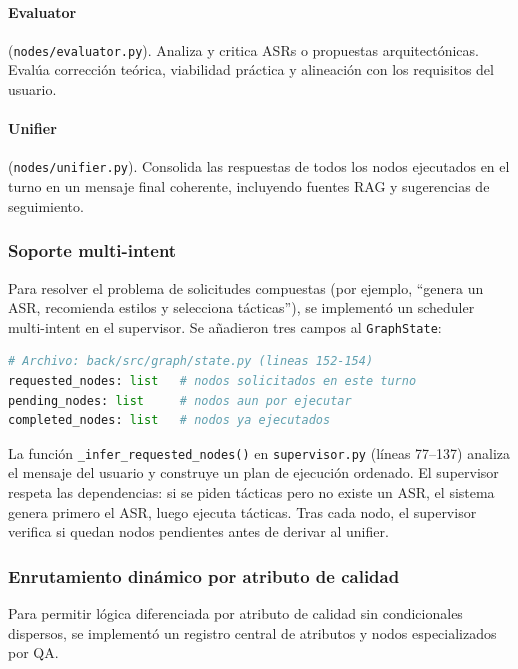 \documentclass[12pt, letterpaper, oneside]{article}
\begin{document}
\paragraph{Evaluator} (\texttt{nodes/evaluator.py}).
Analiza y critica ASRs o propuestas arquitectónicas. Evalúa corrección teórica,
viabilidad práctica y alineación con los requisitos del usuario.

\paragraph{Unifier} (\texttt{nodes/unifier.py}).
Consolida las respuestas de todos los nodos ejecutados en el turno en un mensaje
final coherente, incluyendo fuentes RAG y sugerencias de seguimiento.

\subsubsection{Soporte multi-intent}
\label{sssec:multi-intent}

Para resolver el problema de solicitudes compuestas (por ejemplo, ``genera un ASR,
recomienda estilos y selecciona tácticas''), se implementó un scheduler
multi-intent en el supervisor. Se añadieron tres campos al \texttt{GraphState}:

\begin{lstlisting}[language=Python,
  caption={Campos de planificación multi-intent en \texttt{GraphState}},
  label={lst:multi-intent-state},
  firstnumber=152]
# Archivo: back/src/graph/state.py (lineas 152-154)
requested_nodes: list   # nodos solicitados en este turno
pending_nodes: list     # nodos aun por ejecutar
completed_nodes: list   # nodos ya ejecutados
\end{lstlisting}

La función \texttt{\_infer\_requested\_nodes()} en \texttt{supervisor.py}
(líneas 77--137) analiza el mensaje del usuario y construye un plan de ejecución
ordenado. El supervisor respeta las dependencias: si se piden tácticas pero no
existe un ASR, el sistema genera primero el ASR, luego ejecuta tácticas. Tras
cada nodo, el supervisor verifica si quedan nodos pendientes antes de derivar al
unifier.

\subsubsection{Enrutamiento dinámico por atributo de calidad}
\label{sssec:enrutamiento-qa}

Para permitir lógica diferenciada por atributo de calidad sin condicionales
dispersos, se implementó un registro central de atributos y nodos especializados
por QA.
\end{document}
